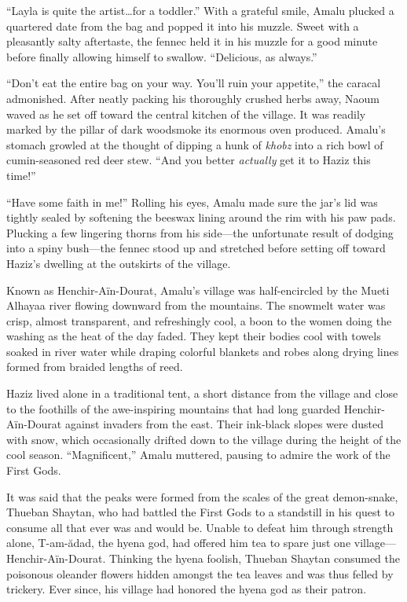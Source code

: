``Layla is quite the artist\ldots{}for a toddler.'' With a grateful smile, Amalu plucked a quartered date from the bag and popped it into his muzzle. Sweet with a pleasantly salty aftertaste, the fennec held it in his muzzle for a good minute before finally allowing himself to swallow. ``Delicious, as always.''

``Don't eat the entire bag on your way. You'll ruin your appetite,'' the caracal admonished. After neatly packing his thoroughly crushed herbs away, Naoum waved as he set off toward the central kitchen of the village. It was readily marked by the pillar of dark woodsmoke its enormous oven produced. Amalu's stomach growled at the thought of dipping a hunk of \emph{khobz} into a rich bowl of cumin-seasoned red deer stew. ``And you better \emph{actually} get it to Haziz this time!''

``Have some faith in me!'' Rolling his eyes, Amalu made sure the jar's lid was tightly sealed by softening the beeswax lining around the rim with his paw pads. Plucking a few lingering thorns from his side---the unfortunate result of dodging into a spiny bush---the fennec stood up and stretched before setting off toward Haziz's dwelling at the outskirts of the village.

Known as Henchir-Aïn-Dourat, Amalu's village was half-encircled by the Mueti Alhayaa river flowing downward from the mountains. The snowmelt water was crisp, almost transparent, and refreshingly cool, a boon to the women doing the washing as the heat of the day faded. They kept their bodies cool with towels soaked in river water while draping colorful blankets and robes along drying lines formed from braided lengths of reed.

Haziz lived alone in a traditional tent, a short distance from the village and close to the foothills of the awe-inspiring mountains that had long guarded Henchir-Aïn-Dourat against invaders from the east. Their ink-black slopes were dusted with snow, which occasionally drifted down to the village during the height of the cool season. ``Magnificent,'' Amalu muttered, pausing to admire the work of the First Gods.

It was said that the peaks were formed from the scales of the great demon-snake, Thueban Shaytan, who had battled the First Gods to a standstill in his quest to consume all that ever was and would be. Unable to defeat him through strength alone, T-am-ădad, the hyena god, had offered him tea to spare just one village---Henchir-Aïn-Dourat. Thinking the hyena foolish, Thueban Shaytan consumed the poisonous oleander flowers hidden amongst the tea leaves and was thus felled by trickery. Ever since, his village had honored the hyena god as their patron.

